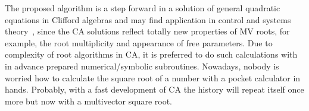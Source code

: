 \documentclass{birkjour}
\begin{document}
The proposed algorithm is a step forward in a solution of general
quadratic equations in Clifford algebras and may find application
in control and systems theory~\cite{Abou2003}, since the CA
solutions reflect totally new properties of MV roots, for example,
the root multiplicity and appearance of free parameters.  Due to
complexity of root algorithms in CA, it is preferred to do such
calculations with in advance prepared numerical/symbolic
subroutines. Nowadays,  nobody is worried how to calculate the
square root of a number with a pocket calculator in hands.
Probably, with a fast development of CA the history will repeat
itself once more but now with a multivector square root.






\end{document}
